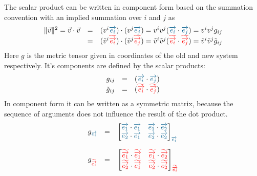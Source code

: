 The scalar product can be written in component form based on the summation convention with
an implied summation over $i$ and $j$ as
\begin{equation}
    \begin{array}{rcl}
        \|\vec{v}\|^2 = \vec{v} \cdot \vec{v} & = & (v^i \hdbv{i}) \cdot (v^j \hdbv{j})
                        = v^i v^j (\hdbv{i}\cdot\hdbv{j})
                        = v^i v^j g_{ij} \\
        & = & (\tilde{v}^i \hdbtv{i}) \cdot (\tilde{v}^j \hdbtv{j})
          = \tilde{v}^i \tilde{v}^j (\hdbtv{i}\cdot\hdbtv{j})
          = \tilde{v}^i \tilde{v}^j \tilde{g}_{ij}
    \end{array}
\end{equation}
Here $g$ is the metric tensor given in coordinates of the old and new system respectively.
It's components are defined by the scalar products:
\begin{equation}
    \begin{array}{rcl}
        g_{ij} & = & (\hdbv{i}\cdot\hdbv{j}) \\
        \tilde{g}_{ij} & = & (\hdbtv{i}\cdot\hdbtv{j})
    \end{array}
\end{equation}
In component form it can be written as a symmetric matrix, because the sequence of
arguments does not influence the result of the dot product.
\begin{equation}
    \begin{array}{rcl}
        g_{\hdbv{i}}& = &
        \prescript{}{}{\begin{bmatrix}
            \hdbv{1}\cdot\hdbv{1} & \hdbv{1}\cdot\hdbv{2} \\
            \hdbv{2}\cdot\hdbv{1} & \hdbv{2}\cdot\hdbv{2} 
        \end{bmatrix}_{\hdbv{i}}} \\
        \noalign{\vskip10pt}
        g_{\hdbtv{i}}& = &
        \prescript{}{}{\begin{bmatrix}
            \hdbtv{1}\cdot\hdbtv{1} & \hdbtv{1}\cdot\hdbtv{2} \\
            \hdbtv{2}\cdot\hdbtv{1} & \hdbtv{2}\cdot\hdbtv{2} 
        \end{bmatrix}_{\hdbtv{i}}}
    \end{array}
\end{equation}

